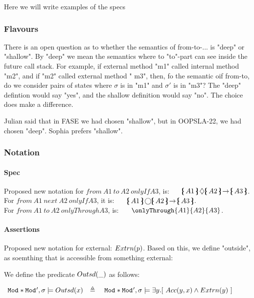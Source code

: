 Here we will write examples of the specs


\subsubsection{Flavours}

There is an open question as to whether the semantics of from-to-... is "deep" or "shallow". By "deep" we mean the semantics where to "to"-part can see inside the future call stack. For example, if external method "m1" called internal  method "m2", and if "m2" called external method " m3", then, fo the semantic oif from-to, do we consider pairs of states where $\sigma$ is in "m1" and $\sigma'$ is in "m3"?  The "deep" defintion would say "yes", and the shallow definition would say "no". The choice does make a difference.

Julian said that in FASE we had chosen "shallow", but in OOPSLA-22, we had chosen "deep". Sophia prefers "shallow".

\subsubsection{Notation}

\paragraph{Spec} Proposed new notation for $from\ A1\ to\  A2\ onlyIf A3$, is: \ \ \  $\onlyIf{A1} {A2} {A3}$. \\
For $from\ A1\ next\  A2\ onlyIf A3$, it is: \ \ \  $\onlyIfSingle{A1} {A2} {A3}$.
\\
For  $from\ A1\ to\  A2\ onlyThrough A3$, is:  \ \ \ $\onlyThrough{A1} {A2} {A3}$.

\paragraph{Assertions} Proposed new notation for external: $Extrn(p)$. Based on this, we define "outside", as soemthing that is accessible from something external:

\begin{definition}
We define the predicate $Outsd(\_)$ as follows:

$\begin{array}{lll}
   \Mod*\Mod{'}, \sigma \models \outside{x} & \triangleq & \ \Mod*\Mod{'}, \sigma \models \exists y.[ \ \access{y} {x} \wedge \external {y}  \ ] \end{array}
$

\end{definition}

